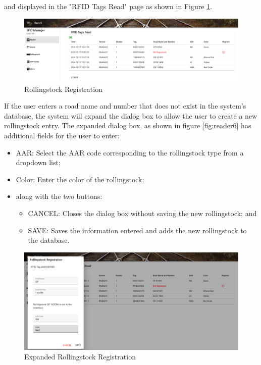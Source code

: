 and displayed in the "RFID Tags Read" page as shown in Figure \ref{fig:reader4}.
\begin{figure}[H]
    \centering
    \includegraphics[scale=0.33]{./images/reader3.png}
    \caption{Rollingstock Registration}
    \label{fig:reader4}
\end{figure}
If the user enters a road name and number that does not exist in the system's database, the system will expand the dialog box to allow 
the user to create a new rollingstock entry. The expanded dialog box, as shown in figure \ref{fig:reader6} has additional fields for the user to enter:
\begin{itemize}
    \item AAR: Select the AAR code corresponding to the rollingstock type from a dropdown list;
    \item Color: Enter the color of the rollingstock;
    \item along with the two buttons:
    \begin{itemize}
        \item CANCEL: Closes the dialog box without saving the new rollingstock; and
        \item SAVE: Saves the information entered and adds the new rollingstock to the database.
    \end{itemize}
\end{itemize}
\begin{figure}[H]
    \centering
    \includegraphics[scale=0.33]{./images/reader4.png}
    \caption{Expanded Rollingstock Registration}
    \label{fig:reader5}
\end{figure}
